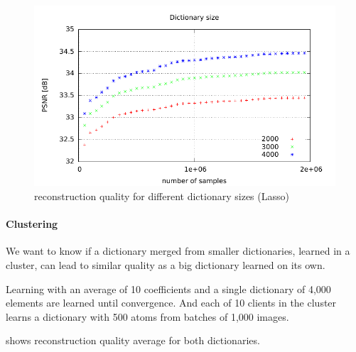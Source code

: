 \begin{figure}[h]
\centering
\includegraphics[width = 1.0\textwidth]{../tests/results/dictSizeLassoGod.pdf}
\caption{reconstruction quality for different dictionary sizes (Lasso)}
\label{fig:dictSizeGood}
\end{figure}




\paragraph{Clustering}
We want to know if a dictionary merged from smaller dictionaries, learned in a
cluster, can lead to similar quality as a big dictionary learned on its own.

Learning with an average of 10 coefficients and a single dictionary of 4,000
elements are learned until convergence. And each of 10 clients in the cluster
learns a dictionary with 500 atoms from batches of 1,000 images. 

 shows reconstruction quality average for both
dictionaries.


